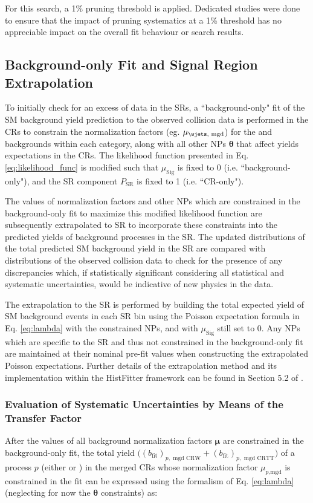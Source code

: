 For this search, a 1\% pruning threshold is applied. Dedicated studies were done to ensure that the impact of pruning systematics at a 1\% threshold has no appreciable impact on the overall fit behaviour or search results. 

\subsection{Background-only Fit and Signal Region Extrapolation}
\label{sec:extrapolation}

To initially check for an excess of data in the SRs, a ``background-only" fit of the SM background yield prediction to the observed collision data is performed in the CRs to constrain the normalization factors (eg. \(\mu_\text{\wjets, mgd}\)) for the \wjets and \ttbar backgrounds within each category, along with all other NPs \(\boldsymbol{\theta}\) that affect yields expectations in the CRs. The likelihood function presented in Eq. \ref{eq:likelihood_func} is modified such that \(\mu_\text{Sig}\) is fixed to 0 (i.e. ``background-only"), and the SR component \(P_\text{SR}\) is fixed to 1 (i.e. ``CR-only"). 

The values of normalization factors and other NPs which are constrained in the background-only fit to maximize this modified likelihood function are subsequently extrapolated to SR to incorporate these constraints into the predicted yields of background processes in the SR. The updated distributions of the total  predicted SM background yield in the SR are compared with distributions of the observed collision data to check for the presence of any  discrepancies which, if statistically significant considering all statistical and systematic uncertainties, would be indicative of new physics in the data. 

The extrapolation to the SR is performed by building the total expected yield of SM background events in each SR bin using the Poisson expectation formula in Eq. \ref{eq:lambda} with the constrained NPs, and with \(\mu_\text{Sig}\) still set to 0. Any NPs which are specific to the SR and thus not constrained in the background-only fit are maintained at their nominal pre-fit values when constructing the extrapolated Poisson expectations. Further details of the extrapolation method and its implementation within the HistFitter framework can be found in Section 5.2 of .

\subsubsection{Evaluation of Systematic Uncertainties by Means of the Transfer Factor}
\label{sec:TF}
After the values of all background normalization factors \(\boldsymbol{\mu}\) are constrained in the background-only fit, the total yield \(\big((b_\text{fit})_{p,\text{ mgd CRW}} + 
(b_\text{fit})_{p,\text{ mgd CRTT}}\big)\) of a process \(p\) (either \wjets or \ttbar) in the merged CRs whose normalization factor \(\mu_{p\text{,mgd}}\) is constrained in the fit can be expressed using the formalism of Eq. \ref{eq:lambda} (neglecting for now the \(\boldsymbol{\theta}\) constraints) as:

